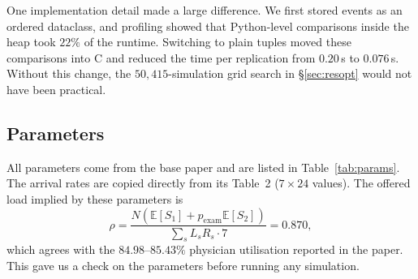 \documentclass[sigconf,nonacm]{acmart}
\begin{document}
One implementation detail made a large difference. We first stored events as
an ordered dataclass, and profiling showed that Python-level comparisons inside
the heap took $22\%$ of the runtime. Switching to plain tuples moved these
comparisons into C and reduced the time per replication from $0.20$\,s to
$0.076$\,s. Without this change, the $50{,}415$-simulation grid search in
\S\ref{sec:resopt} would not have been practical.

\subsection{Parameters}
All parameters come from the base paper and are listed in
Table~\ref{tab:params}. The arrival rates are copied directly from its Table~2
($7\times24$ values). The offered load implied by these parameters is
\begin{equation}
\rho = \frac{N\left(\mathbb{E}[S_1] + p_{\text{exam}}\mathbb{E}[S_2]\right)}
            {\sum_{s} L_s R_s \cdot 7} = 0.870 ,
\end{equation}
which agrees with the $84.98$--$85.43\%$ physician utilisation reported in the
paper. This gave us a check on the parameters before running any simulation.
\end{document}
